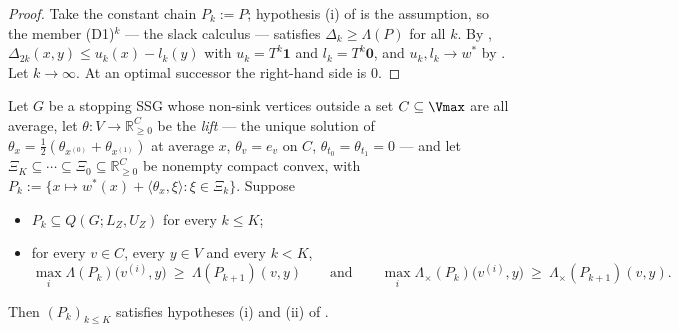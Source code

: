 \begin{proof}
Take the constant chain $P_k:=P$; hypothesis (i) of
 is the assumption, so the member \textup{(D1)}$^k$
--- the slack calculus --- satisfies $\Delta_k\ge\Lambda(P)$ for all $k$.
By , $\Delta_{2k}(x,y)\le u_k(x)-l_k(y)$ with
$u_k=T^{k}\mathbf1$ and $l_k=T^{k}\mathbf0$, and $u_k,l_k\to w^\ast$ by
. Let $k\to\infty$. At an optimal successor the
right-hand side is $0$.
\end{proof}

\begin{lemma}\label{ob:reduction}
Let $G$ be a stopping SSG whose non-sink vertices outside a set
$C\subseteq\Vmax$ are all average, let $\theta\colon V\to\mathbb R^{C}_{\ge0}$
be the \emph{lift} --- the unique solution of
$\theta_x=\tfrac12(\theta_{x^{(0)}}+\theta_{x^{(1)}})$ at average $x$,
$\theta_v=e_v$ on $C$, $\theta_{t_0}=\theta_{t_1}=0$ --- and let
$\Xi_{K}\subseteq\cdots\subseteq\Xi_0\subseteq\mathbb R^{C}_{\ge0}$ be
nonempty compact convex, with
$P_k:=\{x\mapsto w^\ast(x)+\langle\theta_x,\xi\rangle:\xi\in\Xi_k\}$.
Suppose
\begin{itemize}[leftmargin=2.6em]
\item[$(\alpha)$] $P_k\subseteq Q(G;L_Z,U_Z)$ for every $k\le K$;
\item[$(\beta)$] for every $v\in C$, every $y\in V$ and every $k<K$,
\[
  \max_{i}\Lambda(P_k)\bigl(v^{(i)},y\bigr)\ \ge\ \Lambda(P_{k+1})(v,y)
  \qquad\text{and}\qquad
  \max_{i}\Lambda_\times(P_k)\bigl(v^{(i)},y\bigr)\ \ge\
  \Lambda_\times(P_{k+1})(v,y).
\]
\end{itemize}
Then $(P_k)_{k\le K}$ satisfies hypotheses \textup{(i)} and \textup{(ii)}
of \Cref{ob:invariance}.
\end{lemma}

